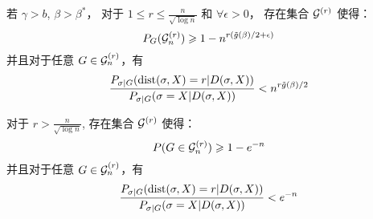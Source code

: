\begin{lemma}\label{prop:small}
  若 $\gamma>b$, $\beta>\beta^\ast$，
  对于 $1\leq r \leq \frac{n}{\sqrt{\log n}}$
  和 $\forall \epsilon > 0$，
  存在集合 $\mathcal{G}^{(r)}$ 使得：
\begin{equation}\label{eq:Gr}
  P_G(\mathcal{G}^{(r)}_n) \geqslant 1 - n^{r(\tilde{g}(\beta)/2 + \epsilon)}
  \end{equation}
  并且对于任意 $G\in\mathcal{G}^{(r)}_n$，有
\begin{equation}\label{eq:psigmaX}
  \frac{P_{\sigma|G}(\operatorname{dist}(\sigma, X)=r | D(\sigma, X))}
  {P_{\sigma|G}(\sigma=X | D(\sigma, X))} <
  n^{r \tilde{g}(\beta) /2}
  \end{equation}
  
  对于 $r> \frac{n}{\sqrt{\log n}}$, 存在集合 $\mathcal{G}^{(r)}$ 使得：
\begin{equation}\label{eq:Gr1}
  P(G\in\mathcal{G}^{(r)}_n) \geqslant 1 - e^{-n}
  \end{equation}
  并且对于任意 $G\in\mathcal{G}^{(r)}_n$，有
\begin{equation}\label{eq:psigmaX1}
  \frac{P_{\sigma|G}(\operatorname{dist}(\sigma, X)=r | D(\sigma, X))}
  {P_{\sigma|G}(\sigma=X | D(\sigma, X))} <
  e^{-n}
  \end{equation}
\end{lemma}

